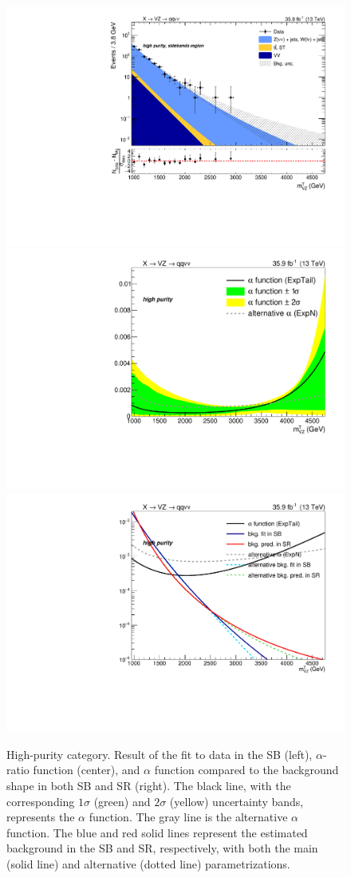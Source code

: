 \begin{figure}[!htb]
  \centering
    \includegraphics[width=.33\textwidth]{plotsAlpha_tesi/XVZnnhp/BkgSB.pdf}
    \includegraphics[width=.33\textwidth]{plotsAlpha_tesi/XVZnnhp/AlphaRatio.pdf}
    \includegraphics[width=.33\textwidth]{plotsAlpha_tesi/XVZnnhp/AlphaMethod_log.pdf}
  \caption{High-purity category. Result of the fit to data in the SB (left), $\alpha$-ratio function (center), and $\alpha$ function compared to the background shape in both SB and SR (right). The black line, with the corresponding $1\sigma$ (green) and $2\sigma$ (yellow) uncertainty bands, represents the $\alpha$ function. The gray line is the alternative $\alpha$ function. The blue and red solid lines represent the estimated background in the SB and SR, respectively, with both the main (solid line) and alternative (dotted line) parametrizations.}
  \label{fig:XVZnnhp_Alpha}
\end{figure}

